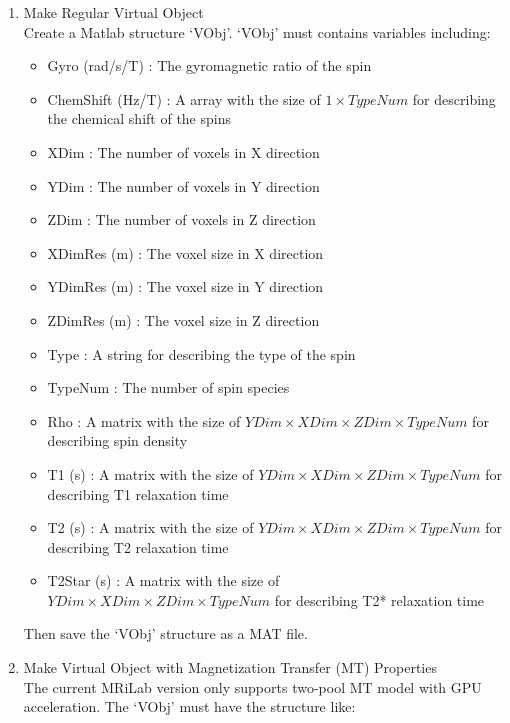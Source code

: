 \documentclass{book}%
\begin{document}
\begin{enumerate}

\item Make Regular Virtual Object \\

Create a Matlab structure `VObj'. `VObj' must contains variables including:

\begin{itemize}
	\item Gyro (rad/s/T) : The gyromagnetic ratio of the spin
	\item ChemShift (Hz/T) : A array with the size of $1 \times TypeNum $ for describing the chemical shift of the spins
	\item XDim : The number of voxels in X direction
	\item YDim : The number of voxels in Y direction
	\item ZDim : The number of voxels in Z direction
	\item XDimRes (m) : The voxel size in X direction
	\item YDimRes (m) : The voxel size in Y direction
	\item ZDimRes (m) : The voxel size in Z direction
	\item Type : A string for describing the type of the spin
	\item TypeNum : The number of spin species
	\item Rho : A matrix with the size of $ YDim \times XDim \times ZDim \times TypeNum $ for describing spin density
	\item T1 (s) : A matrix with the size of $ YDim \times XDim \times ZDim \times TypeNum $ for describing T1 relaxation time
	\item T2 (s) : A matrix with the size of $ YDim \times XDim \times ZDim \times TypeNum $ for describing T2 relaxation time
	\item T2Star (s) : A matrix with the size of $ YDim \times XDim \times ZDim \times TypeNum $ for describing T2* relaxation time
\end{itemize}

Then save the `VObj' structure as a MAT file.

\item Make Virtual Object with Magnetization Transfer (MT) Properties\\

The current MRiLab version only supports two-pool MT model \cite{Yarnykh2002} with GPU acceleration. The `VObj' must have the structure like:


\end{enumerate}
\end{document}
